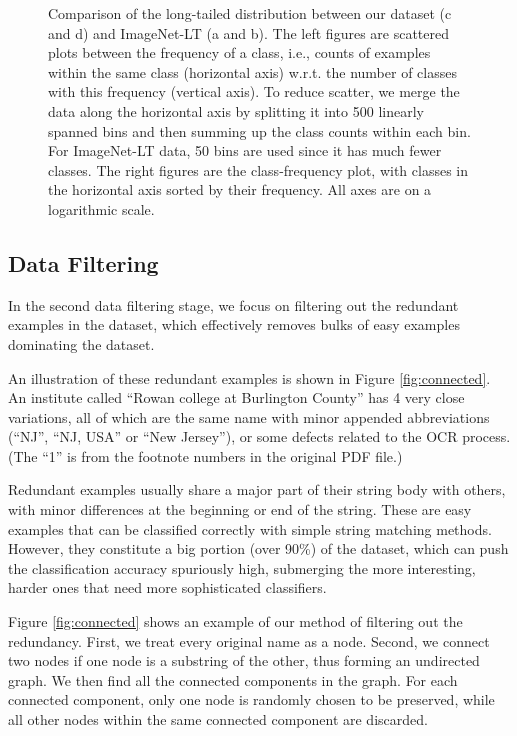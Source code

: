\documentclass{article}
\begin{document}
\begin{figure} [t]
	\centering 
	\caption{Comparison of the long-tailed distribution between our dataset (c and d) and ImageNet-LT (a and b). The left figures are scattered plots between the frequency of a class, i.e., counts of examples within the same class (horizontal axis) w.r.t. the number of classes with this frequency (vertical axis). To reduce scatter, we merge the data along the horizontal axis by splitting it into 500 linearly spanned bins and then summing up the class counts within each bin. For ImageNet-LT data, 50 bins are used since it has much fewer classes. The right figures are the class-frequency plot, with classes in the horizontal axis sorted by their frequency. All axes are on a logarithmic scale.}
	\label{fig:long-tail} 
\end{figure} 

\subsection{Data Filtering}
In the second data filtering stage, we focus on filtering out the redundant examples in the dataset, which effectively removes bulks of easy examples dominating the dataset. 

An illustration of these redundant examples is shown in Figure \ref{fig:connected}. An institute called ``Rowan college at Burlington County'' has 4 very close variations, all of which are the same name with minor appended abbreviations (``NJ'', ``NJ, USA'' or ``New Jersey''), or some defects related to the OCR process. (The ``1'' is from the footnote numbers in the original PDF file.) 

Redundant examples usually share a major part of their string body with others, with minor differences at the beginning or end of the string. These are easy examples that can be classified correctly with simple string matching methods. However, they constitute a big portion (over 90\%) of the dataset, which can push the classification accuracy spuriously high, submerging the more interesting, harder ones that need more sophisticated classifiers. 

Figure \ref{fig:connected} shows an example of our method of filtering out the redundancy. First, we treat every original name as a node. Second, we connect two nodes if one node is a substring of the other, thus forming an undirected graph. We then find all the connected components in the graph. For each connected component, only one node is randomly chosen to be preserved, while all other nodes within the same connected component are discarded. 
\end{document}
